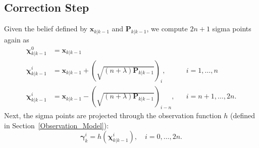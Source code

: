 \subsection{Correction Step}

Given the belief defined by $\mathbf{x}_{k | k-1}$ and $\mathbf{P}_{k | k-1}$, we compute $2n + 1$ sigma points again as
%
\begin{align}
\bm{\chi}^{0}_{k | k-1} &= \mathbf{x}_{k | k-1} & \nonumber\\
\bm{\chi}^{i}_{k | k-1} &= \mathbf{x}_{k | k-1} + \left( \sqrt{\left( n + \lambda \right) \mathbf{P}_{k | k-1}} \right)_{i}, &&i = 1, \dots, n \\
\bm{\chi}^{i}_{k | k-1} &= \mathbf{x}_{k | k-1} - \left( \sqrt{\left( n + \lambda \right) \mathbf{P}_{k | k-1}} \right)_{i-n}, &&i = n+1, \dots, 2n. \nonumber
\end{align}
%
Next, the sigma points are projected through the observation function $h$ (defined in Section~\ref{Observation_Model}):
%
\begin{equation}
\bm{\gamma}^{i}_{k} = h \left( \bm{\chi}^{i}_{k | k-1} \right), \quad i = 0, \dots, 2n.
\end{equation}

